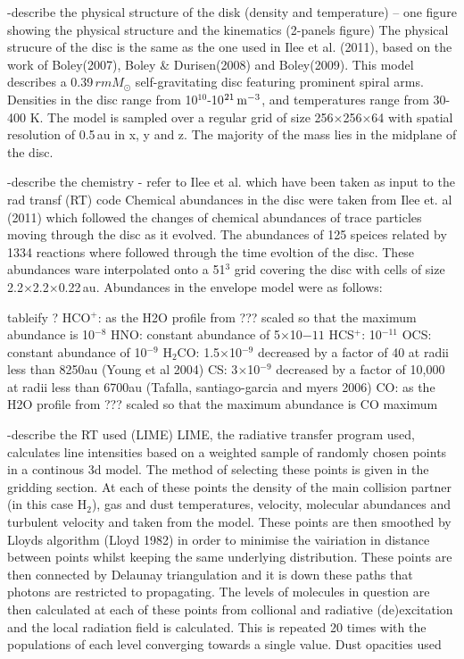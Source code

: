 \documentclass[useAMS,usenatbib]{mn2e}
\begin{document}
-describe the physical structure of the disk (density and temperature) -- one figure showing the physical structure and the kinematics (2-panels figure)
The physical strucure of the disc is the same as the one used in Ilee et al. (2011), based on the work of Boley(2007), Boley \& Durisen(2008) and Boley(2009). This model describes a 0.39$\,rm{M}_\odot$ self-gravitating disc featuring prominent spiral arms. Densities in the disc range from 10$^{10}$-10$^{21}\,\rm{m}^{-3}$, and temperatures range from 30-400 K. The model is sampled over a regular grid of size 256$\times$256$\times$64 with spatial resolution of 0.5$\,$au in x, y and z. The majority of the mass lies in the midplane of the disc.\newline

-describe the chemistry  - refer to Ilee et al. which have been taken as input to the rad transf (RT) code
Chemical abundances in the disc were taken from Ilee et. al (2011) which followed the changes of chemical abundances of trace particles moving through the disc as it evolved. The abundances of 125 speices related by 1334 reactions where followed through the time evoltion of the disc. These abundances ware interpolated onto a 51$^3$ grid covering the disc with cells of size 2.2$\times$2.2$\times$0.22$\,$au. Abundances in the envelope model were as follows:\newline

tableify ?
HCO$^+$: as the H2O profile from ??? scaled so that the maximum abundance is 10$^{-8}$
HNO: constant abundance of 5$\times$10${-11}$
HCS$^+$: 10$^{-11}$
OCS: constant abundance of 10$^{-9}$
H$_2$CO: 1.5$\times$10$^{-9}$ decreased by a factor of 40 at radii less than 8250au (Young et al 2004)
CS:  3$\times$10$^{-9}$ decreased by a factor of 10,000 at radii less than 6700au (Tafalla, santiago-garcia and myers 2006)
CO: as the H2O profile from ??? scaled so that the maximum abundance is CO maximum\newline


-describe the RT used (LIME) 
LIME, the radiative transfer program used, calculates line intensities based on a weighted sample of randomly chosen points in a continous 3d model. The method of selecting these points is given in the gridding section. At each of these points the density of the main collision partner (in this case H$_2$), gas and dust temperatures, velocity, molecular abundances and turbulent velocity and taken from the model. These points are then smoothed by Lloyds algorithm (Lloyd 1982) in order to minimise the vairiation in distance between points whilst keeping the same underlying distribution. These points are then connected by Delaunay triangulation and it is down these paths that photons are restricted to propagating. The levels of molecules in question are then  calculated at each of these points from collional and radiative (de)excitation and the local radiation field is calculated. This is repeated 20 times with the populations of each level converging towards a single value.
 Dust opacities used\newline
\end{document}
